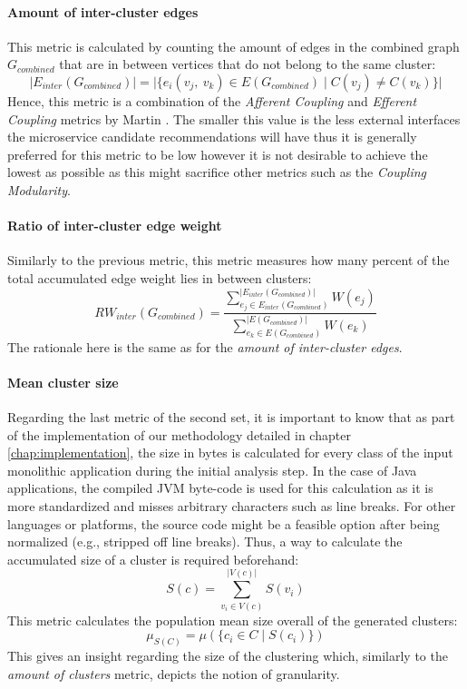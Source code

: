 \documentclass[12pt,a4paper]{report}
\begin{document}
\paragraph{Amount of inter-cluster edges}
This metric is calculated by counting
the amount of edges in the combined graph \(G_{combined}\) that are in between
vertices that do not belong to the same cluster:
\[
  \vert E_{inter}(G_{combined}) \vert =
  \vert \{ e_i(v_j, \ v_k) \in E(G_{combined}) \mid C(v_j) \neq C(v_k) \} \vert
\]
Hence, this metric is a combination of the \textit{Afferent Coupling}
and \textit{Efferent Coupling} metrics by Martin \cite{martin2000design}.
The smaller this value is the less external interfaces the
microservice candidate recommendations will have thus it is generally preferred
for this metric to be low however it is not desirable to achieve the lowest as
possible as this might sacrifice other metrics such as the \textit{Coupling
Modularity}.

\paragraph{Ratio of inter-cluster edge weight}
Similarly to the previous
metric, this metric measures how many percent of the total accumulated edge
weight lies in between clusters:
\[
  RW_{inter}(G_{combined}) =
  \frac{
    \sum_{e_j \in E_{inter}(G_{combined})}^{\vert E_{inter}(G_{combined}) \vert} W(e_j)
  }{
    \sum_{e_k \in E(G_{combined})}^{\vert E(G_{combined}) \vert} W(e_k)
  }
\]
The rationale here is the same as for the \textit{amount of inter-cluster edges}.

\paragraph{Mean cluster size}
Regarding the last metric of the second set, it
is important to know that as part of the implementation of our methodology
detailed in chapter \ref{chap:implementation}, the size in bytes is calculated
for every class of the input monolithic application during the initial analysis
step. In the case of Java applications, the compiled JVM byte-code is used for
this calculation as it is more standardized and misses arbitrary characters
such as line breaks. For other languages or platforms, the source code might be
a feasible option after being normalized (e.g., stripped off line breaks).
Thus, a way to calculate the accumulated size of a cluster is required
beforehand:
\[
  S(c) = \sum_{v_i \in V(c)}^{\vert V(c) \vert} S(v_i)
\]
This metric calculates the population mean size overall of
the generated clusters:
\[
  \mu_{S(C)} = \mu(\{ c_i \in C \mid S(c_i) \})
\]
This gives an insight regarding the size of the clustering which, similarly to the
\textit{amount of clusters} metric, depicts the notion of granularity.
\end{document}
